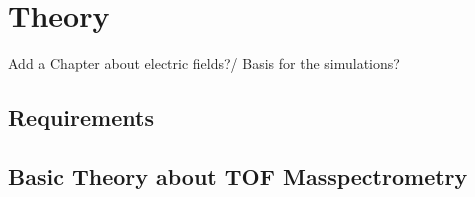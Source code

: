 \section{Theory}
	Add a Chapter about electric fields?/ Basis for the simulations?
	\subsection{Requirements}
	
	\subsection{Basic Theory about TOF Masspectrometry} %
	
	
